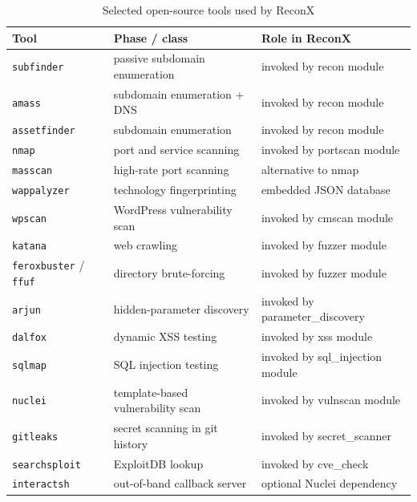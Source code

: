 \begin{table}[h]
\centering
\footnotesize
\begin{tabular}{|l|l|l|}
\hline
\textbf{Tool} & \textbf{Phase / class} & \textbf{Role in ReconX} \\
\hline
\texttt{subfinder} \cite{subfinder}     & passive subdomain enumeration  & invoked by recon module \\
\texttt{amass} \cite{amass}              & subdomain enumeration + DNS    & invoked by recon module \\
\texttt{assetfinder}                     & subdomain enumeration          & invoked by recon module \\
\texttt{nmap} \cite{nmap}                & port and service scanning      & invoked by portscan module \\
\texttt{masscan}                         & high-rate port scanning        & alternative to nmap \\
\texttt{wappalyzer} \cite{wappalyzer}    & technology fingerprinting      & embedded JSON database \\
\texttt{wpscan} \cite{wpscan}            & WordPress vulnerability scan   & invoked by cmscan module \\
\texttt{katana}                          & web crawling                   & invoked by fuzzer module \\
\texttt{feroxbuster} / \texttt{ffuf}     & directory brute-forcing        & invoked by fuzzer module \\
\texttt{arjun} \cite{arjun}              & hidden-parameter discovery     & invoked by parameter\_discovery \\
\texttt{dalfox} \cite{dalfox}            & dynamic XSS testing            & invoked by xss module \\
\texttt{sqlmap} \cite{sqlmap}            & SQL injection testing          & invoked by sql\_injection module \\
\texttt{nuclei} \cite{nuclei}            & template-based vulnerability scan & invoked by vulnscan module \\
\texttt{gitleaks}                        & secret scanning in git history & invoked by secret\_scanner \\
\texttt{searchsploit}                    & ExploitDB lookup               & invoked by cve\_check \\
\texttt{interactsh} \cite{interactsh}    & out-of-band callback server    & optional Nuclei dependency \\
\hline
\end{tabular}
\caption{Selected open-source tools used by ReconX}
\label{tab:tools}
\end{table}

